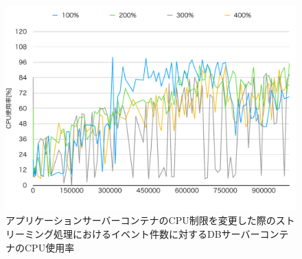 \documentclass[../../../../../main]{subfiles}
\begin{document}
    \begin{figure}[H]
        \centering
        \includegraphics[width=12cm]{graph}
        \caption{アプリケーションサーバーコンテナのCPU制限を変更した際のストリーミング処理におけるイベント件数に対するDBサーバーコンテナのCPU使用率}
        \label{fig:stream-change-app-cpu-limit-db-cpu-app_1024-db_1_1024}
    \end{figure}
\end{document}
